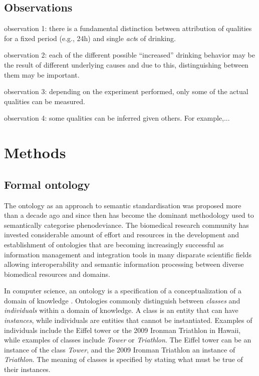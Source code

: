 \documentclass{bioinfo}
\renewcommand{\cite}{\citep}
\begin{document}
\subsection{Observations}
observation 1: there is a fundamental distinction between attribution
of qualities for a fixed period (e.g., 24h) and single {\em act}s of
drinking.

observation 2: each of the different possible ``increased'' drinking
behavior may be the result of different underlying causes and due to
this, distinguishing between them may be important.

observation 3: depending on the experiment performed, only some of the
actual qualities can be measured.

observation 4: some qualities can be inferred given others. For
example,...

\section{Methods}
\subsection{Formal ontology}
The ontology as an approach to semantic standardisation was proposed
more than a decade ago and since then has become the dominant
methodology used to semantically categorise phenodeviance.  The
biomedical research community has invested considerable amount of
effort and resources in the development and establishment of
ontologies that are becoming increasingly successful as information
management and integration tools in many disparate scientific fields
allowing interoperability and semantic information processing between
diverse biomedical resources and domains.

In computer science, an ontology is a specification of a
conceptualization of a domain of knowledge \cite{Gruber1995,
  Guarino1998}.  Ontologies commonly distinguish between {\em classes}
and {\em individuals} within a domain of knowledge. A class is an
entity that can have {\em instances}, while individuals are entities
that cannot be instantiated. Examples of individuals include the
Eiffel tower or the 2009 Ironman Triathlon in Hawaii, while examples
of classes include {\em Tower} or {\em Triathlon}. The Eiffel tower
can be an instance of the class {\em Tower}, and the 2009 Ironman
Triathlon an instance of {\em Triathlon}.  The meaning of classes is
specified by stating what must be true of their instances.
\end{document}
